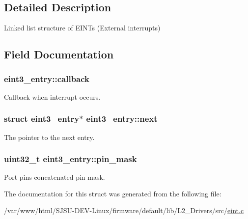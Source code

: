 \subsection{Detailed Description}
Linked list structure of E\+I\+N\+Ts (External interrupts) 

\subsection{Field Documentation}
\subsubsection[{\texorpdfstring{callback}{callback}}]{ eint3\+\_\+entry\+::callback}\hypertarget{structeint3__entry_a3b97b9cf5d0ed8e39024e4f5af34f866}{}\label{structeint3__entry_a3b97b9cf5d0ed8e39024e4f5af34f866}


Callback when interrupt occurs. 

\subsubsection[{\texorpdfstring{next}{next}}]{\setlength{\rightskip}{0pt plus 5cm}struct {\bf eint3\+\_\+entry}$\ast$ eint3\+\_\+entry\+::next}\hypertarget{structeint3__entry_ae7d52ddae024fa3ff613d5fc7967b43c}{}\label{structeint3__entry_ae7d52ddae024fa3ff613d5fc7967b43c}


The pointer to the next entry. 

\subsubsection[{\texorpdfstring{pin\+\_\+mask}{pin_mask}}]{\setlength{\rightskip}{0pt plus 5cm}uint32\+\_\+t eint3\+\_\+entry\+::pin\+\_\+mask}\hypertarget{structeint3__entry_abd6bc384996eb947fc0e9b6ae5002b47}{}\label{structeint3__entry_abd6bc384996eb947fc0e9b6ae5002b47}


Port pin\textquotesingle{}s concatenated pin-\/mask. 



The documentation for this struct was generated from the following file\+:\begin{DoxyCompactItemize}
\item 
/var/www/html/\+S\+J\+S\+U-\/\+D\+E\+V-\/\+Linux/firmware/default/lib/\+L2\+\_\+\+Drivers/src/\hyperlink{eint_8c}{eint.\+c}\end{DoxyCompactItemize}
